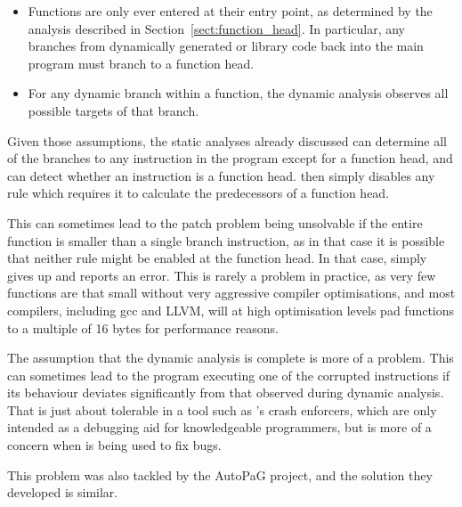 \begin{itemize}
\item
  Functions are only ever entered at their entry point, as determined
  by the analysis described in Section~\ref{sect:function_head}.  In
  particular, any branches from dynamically generated or library code
  back into the main program must branch to a function head.
\item
  For any dynamic branch within a function, the dynamic analysis
  observes all possible targets of that branch.
\end{itemize}

Given those assumptions, the static analyses already discussed can
determine all of the branches to any instruction in the program except
for a function head, and can detect whether an instruction is a
function head.  {\Technique} then simply disables any rule which
requires it to calculate the predecessors of a function head.

This can sometimes lead to the patch problem being unsolvable if the
entire function is smaller than a single branch instruction, as in
that case it is possible that neither rule might be enabled at the
function head.  In that case, {\implementation} simply gives up and
reports an error.  This is rarely a problem in practice, as very few
functions are that small without very aggressive compiler
optimisations, and most compilers, including gcc and LLVM\needCite{},
will at high optimisation levels pad functions to a multiple of 16
bytes for performance reasons.

The assumption that the dynamic analysis is complete is more of a
problem.  This can sometimes lead to the program executing one of the
corrupted instructions if its behaviour deviates significantly from
that observed during dynamic analysis.  That is just about tolerable
in a tool such as {\technique}'s crash enforcers, which are only
intended as a debugging aid for knowledgeable programmers, but is more
of a concern when {\technique} is being used to fix bugs. 

This problem was also tackled by the AutoPaG project, and the solution
they developed is similar. 

